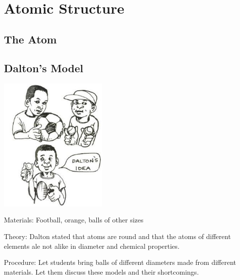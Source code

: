 \section{Atomic Structure} %

\begin{multicols}{2}


\section*{The Atom} 


\subsection{Dalton's Model} 

\begin{center}
\includegraphics[width=0.4\textwidth]{./img/source/dalton-model.jpg}
\end{center}

\begin{description*}
\item[Materials:]{Football, orange, balls of other sizes}
\item[Theory:]{Dalton stated that atoms are round and
that the atoms of different elements ale not alike
in diameter and chemical properties. }
\item[Procedure:]{Let students bring balls of different diameters
made from different materials. Let them discuss
these models and their shortcomings.}
\end{description*}


\end{multicols}
